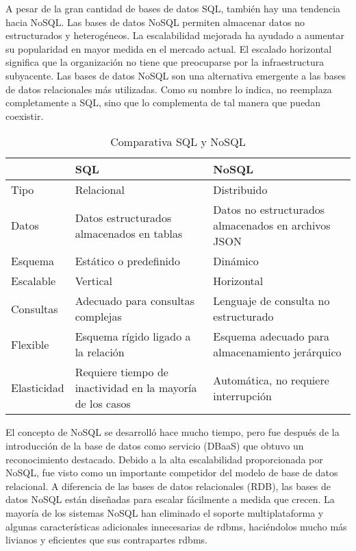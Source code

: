 A pesar de la gran cantidad de bases de datos SQL, también hay una tendencia hacia NoSQL. Las bases de datos NoSQL permiten almacenar datos no estructurados y heterogéneos. La \gls{escalabilidad} mejorada ha ayudado a aumentar su popularidad en mayor medida en el mercado actual. El escalado horizontal significa que la organización no tiene que preocuparse por la infraestructura subyacente. Las bases de datos NoSQL son una alternativa emergente a las bases de datos relacionales más utilizadas. Como su nombre lo indica, no reemplaza completamente a SQL, sino que lo complementa de tal manera que puedan coexistir.
\vspace{0.8cm}

\begin{table}[H]
  \renewcommand{\arraystretch}{1.5}
  \centering
  \scriptsize
  \begin{tabular}{ |p{2cm}||p{5cm}|p{5cm}|  }
    \hline
      & SQL
      & NoSQL \\
    \hline
    Tipo
      & Relacional
      & Distribuido \\
    \hline
    Datos
      & Datos estructurados almacenados en tablas 
      & Datos no estructurados almacenados en archivos JSON \\
    \hline
    Esquema 
      & Estático o predefinido
      & Dinámico \\
    \hline
    Escalable 
      & Vertical
      & Horizontal \\
    \hline
    Consultas
      & Adecuado para consultas complejas 
      & Lenguaje de consulta no estructurado \\
    \hline
    Flexible
      & Esquema rígido ligado a la relación 
      & Esquema adecuado para almacenamiento jerárquico \\
    \hline
    Elasticidad
      & Requiere tiempo de inactividad en la mayoría de los casos 
      & Automática, no requiere interrupción \\
    \hline
  \end{tabular}
  \caption{Comparativa SQL y NoSQL}
\end{table}
\vspace{0.8cm}

El concepto de NoSQL se desarrolló hace mucho tiempo, pero fue después de la introducción de la base de datos como servicio (DBaaS) que obtuvo un reconocimiento destacado. Debido a la alta \gls{escalabilidad} proporcionada por NoSQL, fue visto como un importante competidor del modelo de base de datos relacional. A diferencia de las bases de datos relacionales (RDB), las bases de datos NoSQL están diseñadas para escalar fácilmente a medida que crecen. La mayoría de los sistemas NoSQL han eliminado el soporte multiplataforma y algunas características adicionales innecesarias de \acrshort{rdbms}, haciéndolos mucho más livianos y eficientes que sus contrapartes \acrshort{rdbms}.


